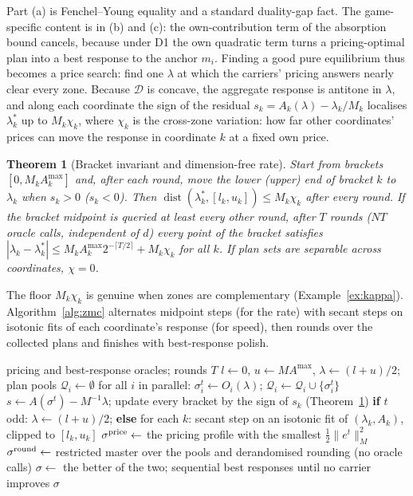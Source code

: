 \documentclass[preprint,11pt]{elsarticle}
\newtheorem{theorem}{Theorem}
\theoremstyle{definition}
\theoremstyle{remark}
\newcommand{\Amax}{A^{\max}}
\begin{document}
Part (a) is Fenchel--Young equality and a standard duality-gap fact. The game-specific content is in (b) and (c): the own-contribution term of the absorption bound cancels, because under D1 the own quadratic term turns a pricing-optimal plan into a best response to the anchor $m_i$. Finding a good pure equilibrium thus becomes a price search: find one $\lambda$ at which the carriers' pricing answers nearly clear every zone. Because $\mathcal D$ is concave, the aggregate response is antitone in $\lambda$, and along each coordinate the sign of the residual $s_k=A_k(\lambda)-\lambda_k/M_k$ localises $\lambda^*_k$ up to $M_k\chi_k$, where $\chi_k$ is the cross-zone variation: how far other coordinates' prices can move the response in coordinate $k$ at a fixed own price.

\begin{theorem}[Bracket invariant and dimension-free rate]\label{thm:bracket}
Start from brackets $[0,M_k\Amax_k]$ and, after each round, move the lower (upper) end of bracket $k$ to $\lambda_k$ when $s_k>0$ ($s_k<0$). Then $\operatorname{dist}(\lambda^*_k,[l_k,u_k])\le M_k\chi_k$ after every round. If the bracket midpoint is queried at least every other round, after $T$ rounds ($NT$ oracle calls, independent of $d$) every point of the bracket satisfies $|\lambda_k-\lambda^*_k|\le M_k\Amax_k2^{-\lceil T/2\rceil}+M_k\chi_k$ for all $k$. If plan sets are separable across coordinates, $\chi=0$.
\end{theorem}

The floor $M_k\chi_k$ is genuine when zones are complementary (Example~\ref{ex:kappa}). Algorithm~\ref{alg:zmc} alternates midpoint steps (for the rate) with secant steps on isotonic fits of each coordinate's response (for speed), then rounds over the collected plans and finishes with best-response polish.

\begin{algorithm}[t]
\caption{ZMC: zone-market clearing for pure equilibria of the D1 game}\label{alg:zmc}
\begin{algorithmic}[1]
\Require pricing and best-response oracles; rounds $T$
\State $l\gets0$, $u\gets M\Amax$, $\lambda\gets(l+u)/2$; plan pools $\mathcal Q_i\gets\emptyset$
 \State for all $i$ in parallel: $\sigma^t_i\gets O_i(\lambda)$; $\mathcal Q_i\gets\mathcal Q_i\cup\{\sigma^t_i\}$ 
 \State $s\gets A(\sigma^t)-M^{-1}\lambda$; update every bracket by the sign of $s_k$ (Theorem~\ref{thm:bracket})
 \State \textbf{if} $t$ odd: $\lambda\gets(l+u)/2$; \textbf{else} for each $k$: secant step on an isotonic fit of $(\lambda_k,A_k)$, clipped to $[l_k,u_k]$
\EndFor
\State $\sigma^{\rm price}\gets$ the pricing profile with the smallest $\tfrac12\|e^t\|_M^2$
\State $\sigma^{\rm round}\gets$ restricted master over the pools and derandomised rounding (no oracle calls)
\State $\sigma\gets$ the better of the two; sequential best responses until no carrier improves
\State \Return $\sigma$
\end{algorithmic}
\end{algorithm}
\end{document}
